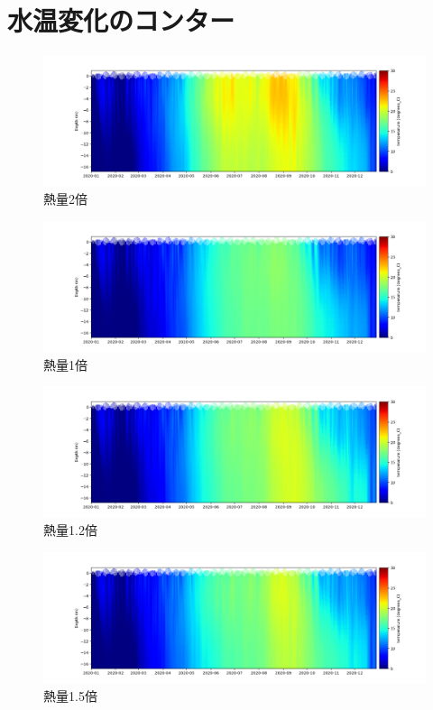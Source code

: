\documentclass[12pt,a4paper]{jarticle}
\begin{document}
\section{水温変化のコンター}
\begin{figure}[hbtp]
    \includegraphics[keepaspectratio,width=180mm]{contour/Tokyo3_chiba1buoy.png}
    \caption{熱量2倍}
\end{figure}

\begin{figure}[hbtp]
    \centering
        \includegraphics[keepaspectratio,scale=0.5]{contour/Tokyo4_chiba1buoy.png}
    \caption{熱量1倍}
\end{figure}

\begin{figure}[hbtp]
    \centering
        \includegraphics[keepaspectratio,scale=0.5]{contour/Tokyo5_chiba1buoy.png}
    \caption{熱量1.2倍}
\end{figure}

\begin{figure}[hbtp]
    \centering
        \includegraphics[keepaspectratio,scale=0.5]{contour/Tokyo6_chiba1buoy.png}
    \caption{熱量1.5倍}
\end{figure}
\end{document}
